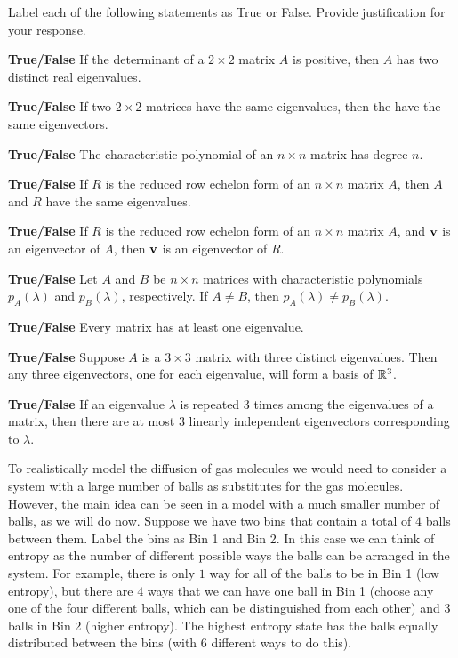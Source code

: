 \item Label each of the following statements as True or False. Provide justification for your response.
\ba

\item \textbf{True/False} If the determinant of a $2 \times 2$ matrix $A$ is positive, then $A$ has two distinct real eigenvalues.

\item \textbf{True/False} If two $2 \times 2$ matrices have the same eigenvalues, then the have the same eigenvectors. 

\item \textbf{True/False} The characteristic polynomial of an $n \times n$ matrix has degree $n$.

\item \textbf{True/False} If $R$ is the reduced row echelon form of an $n \times n$ matrix $A$, then $A$ and $R$ have the same eigenvalues. 

\item \textbf{True/False} If $R$ is the reduced row echelon form of an $n \times n$ matrix $A$, and $\mathbf{v}$ is an eigenvector of $A$, then $\mathbf{v}$ is an eigenvector of $R$. 

\item \textbf{True/False} Let $A$ and $B$ be $n \times n$ matrices with characteristic polynomials $p_A(\lambda)$ and $p_B(\lambda)$, respectively. If $A \neq B$, then $p_A(\lambda) \neq p_B(\lambda)$. 

\item \textbf{True/False}  Every matrix has at least one eigenvalue. 

\item \textbf{True/False}  Suppose $A$ is a $3 \times 3$ matrix with three distinct eigenvalues. Then any three eigenvectors, one for each eigenvalue, will form a basis of $\mathbb{R}^3$.

\item \textbf{True/False} If an eigenvalue $\lambda$ is repeated 3 times among the eigenvalues of a matrix, then there are at most 3 linearly independent eigenvectors corresponding to $\lambda$.


\ea

\ee

\label{sec:proj_ehrenfest}

To realistically model the diffusion of gas molecules we would need to consider a system with a large number of balls as substitutes for the gas molecules. However, the main idea can be seen in a model with a much smaller number of balls, as we will do now. Suppose we have two bins that contain a total of $4$ balls between them. Label the bins as Bin 1 and Bin 2. In this case we can think of entropy as the number of different possible ways the balls can be arranged in the system. For example, there is only $1$ way for all of the balls to be in Bin 1 (low entropy), but there are $4$ ways that we can have one ball in Bin 1 (choose any one of the four different balls, which can be distinguished from each other) and $3$ balls in Bin 2 (higher entropy). The highest entropy state has the balls equally distributed between the bins (with $6$ different ways to do this).

